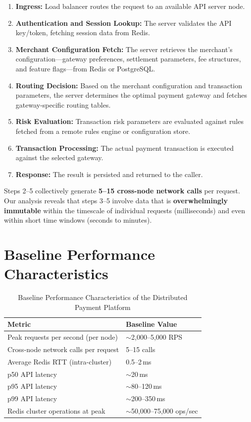 \documentclass[12pt,a4paper]{report}
\begin{document}
\begin{enumerate}
    \item \textbf{Ingress:} Load balancer routes the request to an available API server node.
    \item \textbf{Authentication and Session Lookup:} The server validates the API key/token, fetching session data from Redis.
    \item \textbf{Merchant Configuration Fetch:} The server retrieves the merchant's configuration—gateway preferences, settlement parameters, fee structures, and feature flags—from Redis or PostgreSQL.
    \item \textbf{Routing Decision:} Based on the merchant configuration and transaction parameters, the server determines the optimal payment gateway and fetches gateway-specific routing tables.
    \item \textbf{Risk Evaluation:} Transaction risk parameters are evaluated against rules fetched from a remote rules engine or configuration store.
    \item \textbf{Transaction Processing:} The actual payment transaction is executed against the selected gateway.
    \item \textbf{Response:} The result is persisted and returned to the caller.
\end{enumerate}

Steps 2–5 collectively generate \textbf{5–15 cross-node network calls} per request. Our analysis reveals that steps 3–5 involve data that is \textbf{overwhelmingly immutable} within the timescale of individual requests (milliseconds) and even within short time windows (seconds to minutes).

\section{Baseline Performance Characteristics}

\begin{table}[h]
\centering
\begin{tabular}{@{} l l @{}}
\toprule
\textbf{Metric} & \textbf{Baseline Value} \\
\midrule
Peak requests per second (per node) & $\sim$2,000–5,000 RPS \\
Cross-node network calls per request & 5–15 calls \\
Average Redis RTT (intra-cluster) & 0.5–2\,ms \\
p50 API latency & $\sim$20\,ms \\
p95 API latency & $\sim$80–120\,ms \\
p99 API latency & $\sim$200–350\,ms \\
Redis cluster operations at peak & $\sim$50,000–75,000 ops/sec \\
\bottomrule
\end{tabular}
\caption{Baseline Performance Characteristics of the Distributed Payment Platform}
\label{tab:baseline-performance}
\end{table}
\end{document}
